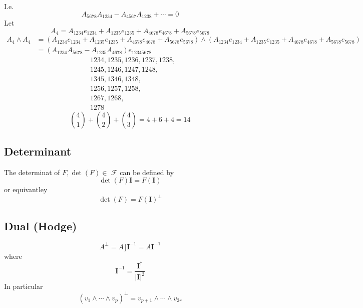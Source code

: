 \documentclass[aps,preprint]{revtex4}%
\begin{document}
I.e.
\begin{equation}
A_{5678}A_{1234}-A_{4567}A_{1238}+\cdots=0
\end{equation}
Let%
\[
A_{4}=A_{1234}e_{1234}+A_{1235}e_{1235}+A_{4678}e_{4678}+A_{5678}e_{5678}%
\]%
\begin{align}
A_{4}\wedge A_{4}  &  =\left(  A_{1234}e_{1234}+A_{1235}e_{1235}%
+A_{4678}e_{4678}+A_{5678}e_{5678}\right)  \wedge\left(  A_{1234}%
e_{1234}+A_{1235}e_{1235}+A_{4678}e_{4678}+A_{5678}e_{5678}\right) \\
&  =\left(  A_{1234}A_{5678}-A_{1235}A_{4678}\right)  e_{12345678}%
\end{align}%
\begin{align}
&  1234,1235,1236,1237,1238,\\
&  1245,1246,1247,1248,\\
&  1345,1346,1348,\\
&  1256,1257,1258,\\
&  1267,1268,\\
&  1278
\end{align}%
\begin{equation}
\binom{4}{1}+\binom{4}{2}+\binom{4}{3}=4+6+4=14
\end{equation}


\subsection{Determinant}

The determinat of $F,\det(F)\in$ $\mathcal{F}$ can be defined by
\begin{equation}
\det(F)\mathbf{I}=F\left(  \mathbf{I}\right)
\end{equation}
or equivantley
\begin{equation}
\det(F)=F\left(  \mathbf{I}\right)  ^{\bot}%
\end{equation}


\subsection{Dual (Hodge)}%

\begin{equation}
A^{\bot}=A\rfloor\mathbf{I}^{-1}=A\mathbf{I}^{-1}%
\end{equation}
where
\begin{equation}
\mathbf{I}^{-1}=\frac{\mathbf{I}^{\dagger}}{\left\vert \mathbf{I}\right\vert
^{2}}%
\end{equation}
In particular
\begin{equation}
\left(  v_{1}\wedge\cdots\wedge v_{p}\right)  ^{\bot}=v_{p+1}\wedge
\cdots\wedge v_{2r}%
\end{equation}
\end{document}

